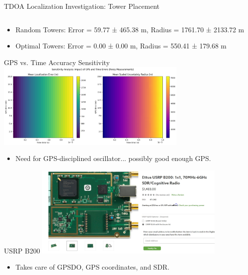 \begin{frame}{TDOA Localization Investigation: Tower Placement}
\begin{columns}
\begin{column}{0.48\textwidth}
        \end{column}
    \end{columns}
    \vspace{0.5cm}
    \begin{itemize}
        \item Random Towers: Error = 59.77 ± 465.38 m, Radius = 1761.70 ± 2133.72 m
        \item Optimal Towers: Error = 0.00 ± 0.00 m, Radius = 550.41 ± 179.68 m
    \end{itemize}
\end{frame}


\begin{frame}{GPS vs. Time Accuracy Sensitivity}
    \centering
    \includegraphics[height=0.7\textheight,width=0.7\textwidth,keepaspectratio]{images/rtt/gpstime.png}
    \vspace{0.5cm}
    \begin{itemize}
        \item Need for GPS-disciplined oscillator... possibly good enough GPS. 
    \end{itemize}
\end{frame}

\begin{frame}{USRP B200}
    \centering
    \includegraphics[height=0.7\textheight,width=0.7\textwidth,keepaspectratio]{images/rtt/usrp.jpg}
    \vspace{0.5cm}
    \begin{itemize}
        \item Takes care of GPSDO, GPS coordinates, and SDR.
    \end{itemize}
\end{frame}

